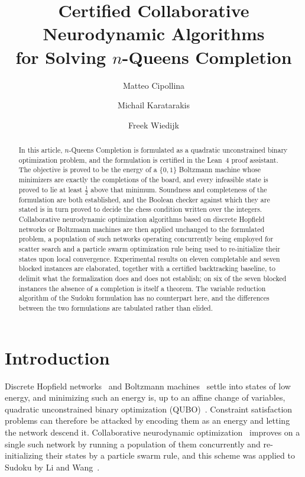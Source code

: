 \documentclass{easychair}
\title{Certified Collaborative Neurodynamic Algorithms\\ for Solving $n$-Queens Completion}
\author{
Matteo Cipollina\inst{1}
\and
Michail Karatarakis\inst{2}
\and
Freek Wiedijk\inst{2}
}
\institute{
  Axiomatic AI, Barcelona, Spain\\
  \email{matteo.cipollina@yahoo.it}
\and
  Radboud University, Nijmegen, The Netherlands\\
  \email{michail.karatarakis@ru.nl, freek@cs.ru.nl}\\
}
\newcommand{\citeref}[1]{\textcolor{academicpurple}{\cite{#1}}}
\begin{document}
\maketitle

\begin{abstract}
In this article, $n$-Queens Completion is formulated as a quadratic unconstrained binary
optimization problem, and the formulation is certified in the Lean~4 proof assistant. The objective
is proved to be the energy of a $\{0,1\}$ Boltzmann machine whose minimizers are exactly the
completions of the board, and every infeasible state is proved to lie at least $\tfrac12$ above that
minimum. Soundness and completeness of the formulation are both established, and the Boolean checker
against which they are stated is in turn proved to decide the chess condition written over the
integers. Collaborative neurodynamic optimization algorithms based on discrete Hopfield networks or
Boltzmann machines are then applied unchanged to the formulated problem, a population of such
networks operating concurrently being employed for scatter search and a particle swarm optimization
rule being used to re-initialize their states upon local convergence. Experimental results on eleven
completable and seven blocked instances are elaborated, together with a certified backtracking
baseline, to delimit what the formalization does and does not establish; on six of the seven blocked
instances the absence of a completion is itself a theorem. The variable reduction algorithm of the
Sudoku formulation has no counterpart here, and the differences between the two formulations are
tabulated rather than elided.
\end{abstract}

\section{Introduction}\label{sec:intro}

Discrete Hopfield networks~\citeref{hopfield1982} and Boltzmann machines~\citeref{ackley1985} settle
into states of low energy, and minimizing such an energy is, up to an affine change of variables,
quadratic unconstrained binary optimization (QUBO)~\citeref{lucas2014ising, glover2019}. Constraint
satisfaction problems can therefore be attacked by encoding them as an energy and letting the network
descend it. Collaborative neurodynamic optimization~\citeref{che2019} improves on a single such
network by running a population of them concurrently and re-initializing their states by a particle
swarm rule, and this scheme was applied to Sudoku by Li and Wang~\citeref{liwang2022}.
\end{document}
